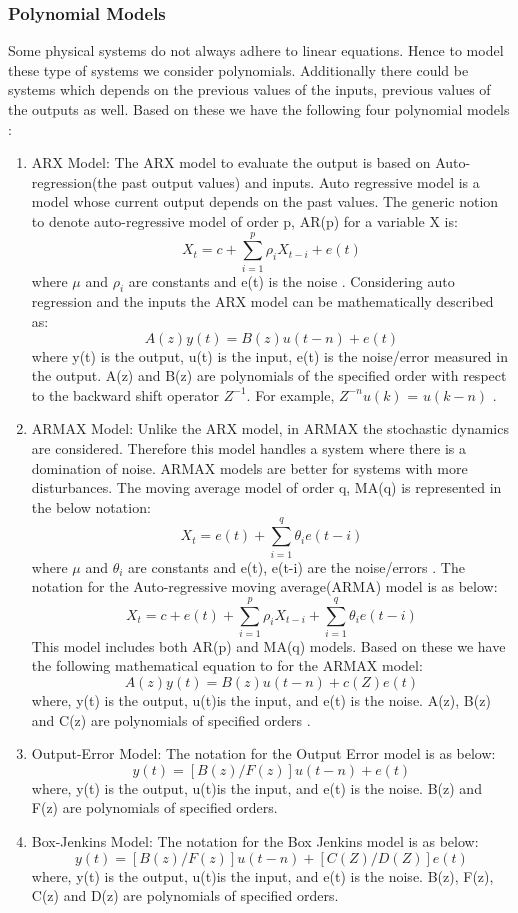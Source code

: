 \documentclass[article,type=msc,colorback,12pt,accentcolor=tud7b]{tudthesis}
\begin{document}
\subsubsection{Polynomial Models}
	
	Some physical systems do not always adhere to linear equations. Hence to model these type of systems we consider polynomials. Additionally there could be systems which depends on the previous values of the inputs, previous values of the outputs as well. Based on these we have the following four polynomial models \cite{ljung1998system}:
	
	\begin{enumerate}
		\item{ARX Model:} The ARX model to evaluate the output is based on Auto-regression(the past output values) and inputs. Auto regressive model is a model whose current output depends on the past values. The generic notion to denote auto-regressive model of order p, AR(p) for a variable X is: $$ X_t = c + \sum_{i=1}^{p} \rho_i X_{t-i} + e(t) $$ where $ \mu $ and $ \rho_i $ are constants and e(t) is the noise \cite{arma}. Considering auto regression and the inputs the ARX model can be mathematically described as: $$ A(z) y(t) = B(z) u(t-n) + e(t) $$ where y(t) is the output, u(t) is the input, e(t) is the noise/error measured in the output. A(z) and B(z) are polynomials of the specified order with respect to the backward shift operator $Z^{-1}$. For example, $Z^{-n}  u(k)$ = $u(k-n)$ \cite{arx}.
		
	\item{ARMAX Model:} Unlike the ARX model, in ARMAX the stochastic dynamics are considered. Therefore this model handles a system where there is a domination of noise. ARMAX models are better for systems with more disturbances. The moving average model of order q, MA(q) is represented in the below notation: $$ X_t =  e(t) + \sum_{i=1}^{q} \theta_i e(t-i) $$ where $ \mu $ and $ \theta_i $ are constants and e(t), e(t-i) are the noise/errors \cite{arma}. The notation for the Auto-regressive moving average(ARMA) model is as below: $$ X_t = c + e(t) + \sum_{i=1}^{p} \rho_i X_{t-i} + \sum_{i=1}^{q} \theta_i e(t-i) $$ This model includes both AR(p) and MA(q) models. Based on these we have the following mathematical equation to for the ARMAX model: $$ A(z) y(t) = B(z) u(t-n) + c(Z) e(t) $$ where, y(t) is the output, u(t)is the input, and e(t) is the noise. A(z), B(z) and C(z) are polynomials of specified orders \cite{armax}. 
	
	\item{Output-Error Model:} 
		The notation for the Output Error model is as below: $$ y(t) = [B(z)/F(z)] u(t-n) + e(t) $$ where, y(t) is the output, u(t)is the input, and e(t) is the noise. B(z) and F(z) are polynomials of specified orders.
	
	\item{Box-Jenkins Model:} 	
		 The notation for the Box Jenkins model is as below: $$ y(t) = [B(z)/F(z)] u(t-n) + [C(Z)/D(Z)] e(t) $$ where, y(t) is the output, u(t)is the input, and e(t) is the noise. B(z), F(z), C(z) and D(z) are polynomials of specified orders.
		 
	\end{enumerate}
	
\end{document}
